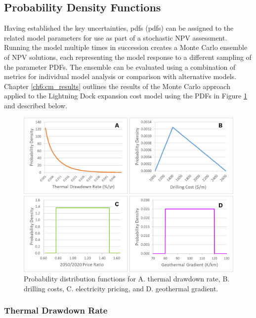 \subsection{Probability Density Functions}\label{ch4:pdfs}

Having established the key uncertainties, \acrlong{pdf}s (\acrshort{pdf}s) can be assigned to the related model parameters for use as part of a stochastic NPV assessment. Running the model multiple times in succession creates a Monte Carlo ensemble of NPV solutions, each representing the model response to a different sampling of the parameter PDFs. The ensemble can be evaluated using a combination of metrics for individual model analysis or comparison with alternative models. Chapter \ref{ch6:cm_results} outlines the results of the Monte Carlo approach applied to the Lightning Dock expansion cost model using the PDFs in Figure \ref{fig:cm_probdists} and described below.

\begin{figure}
\centering
\includegraphics[width=.85\textwidth]{templates/images/Figure-ProbDists.png}
\singlespacing
\caption[Cost model probability distributions]{Probability distribution functions for A. thermal drawdown rate, B. drilling costs, C. electricity pricing, and D. geothermal gradient.}
\label{fig:cm_probdists}
\end{figure}

\subsubsection{Thermal Drawdown Rate}\label{cm4:prob_tdr}

